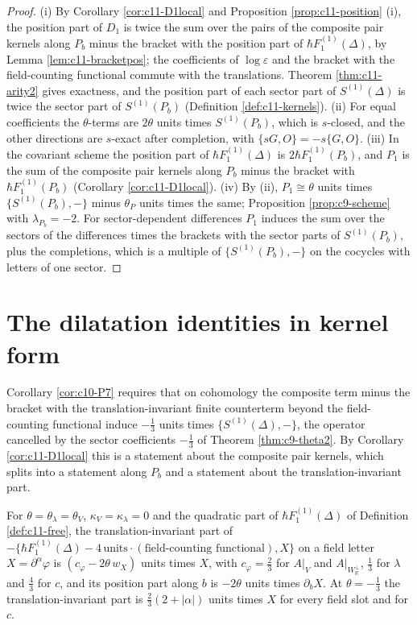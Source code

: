 \begin{proof}
(i) By Corollary \ref{cor:c11-D1local} and Proposition \ref{prop:c11-position} (i), the position part of $D_1$ is twice the sum over the pairs of the composite pair kernels along $P_b$ minus the bracket with the position part of $\hbar F_1^{(1)}(\Delta)$, by Lemma \ref{lem:c11-bracketpos}; the coefficients of $\log\varepsilon$ and the bracket with the field-counting functional commute with the translations. Theorem \ref{thm:c11-arity2} gives exactness, and the position part of each sector part of $S^{(1)}(\Delta)$ is twice the sector part of $S^{(1)}(P_b)$ (Definition \ref{def:c11-kernels}). (ii) For equal coefficients the $\theta$-terms are $2\theta$ units times $S^{(1)}(P_b)$, which is $s$-closed, and the other directions are $s$-exact after completion, with $\{sG,O\}=-s\{G,O\}$. (iii) In the covariant scheme the position part of $\hbar F_1^{(1)}(\Delta)$ is $2\hbar F_1^{(1)}(P_b)$, and $P_1$ is the sum of the composite pair kernels along $P_b$ minus the bracket with $\hbar F_1^{(1)}(P_b)$ (Corollary \ref{cor:c11-D1local}). (iv) By (ii), $P_1\cong\theta$ units times $\{S^{(1)}(P_b),-\}$ minus $\theta_P$ units times the same; Proposition \ref{prop:c9-scheme} with $\lambda_{P_b}=-2$. For sector-dependent differences $P_1$ induces the sum over the sectors of the differences times the brackets with the sector parts of $S^{(1)}(P_b)$, plus the completions, which is a multiple of $\{S^{(1)}(P_b),-\}$ on the cocycles with letters of one sector.
\end{proof}

\section{The dilatation identities in kernel form}

Corollary \ref{cor:c10-P7} requires that on cohomology the composite term minus the bracket with the translation-invariant finite counterterm beyond the field-counting functional induce $-\tfrac13$ units times $\{S^{(1)}(\Delta),-\}$, the operator cancelled by the sector coefficients $-\tfrac13$ of Theorem \ref{thm:c9-theta2}. By Corollary \ref{cor:c11-D1local} this is a statement about the composite pair kernels, which splits into a statement along $P_b$ and a statement about the translation-invariant part.

\begin{lemma}
\label{lem:c11-onebody}
For $\theta=\theta_\lambda=\theta_V$, $\kappa_V=\kappa_\lambda=0$ and the quadratic part of $\hbar F_1^{(1)}(\Delta)$ of Definition \ref{def:c11-free}, the translation-invariant part of $-\big\{\hbar F_1^{(1)}(\Delta)-4\,\text{units}\cdot(\text{field-counting functional}),X\big\}$ on a field letter $X=\partial^\alpha\varphi$ is $(c_\varphi-2\theta\,w_X)$ units times $X$, with $c_\varphi=\tfrac23$ for $A|_V$ and $A|_{W_{\mathbb R}^\perp}$, $\tfrac13$ for $\lambda$ and $\tfrac43$ for $c$, and its position part along $b$ is $-2\theta$ units times $\partial_bX$. At $\theta=-\tfrac13$ the translation-invariant part is $\tfrac23(2+|\alpha|)$ units times $X$ for every field slot and for $c$.
\end{lemma}

